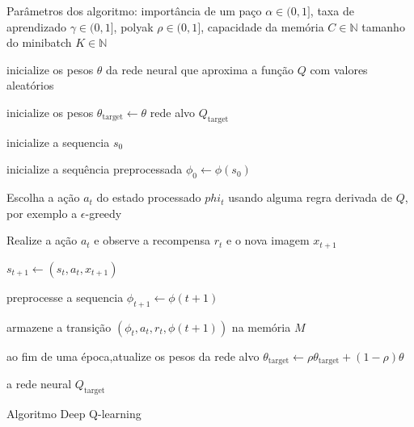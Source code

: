\begin{algorithm}[H]
    Parâmetros dos algoritmo:
    importância de um paço $\alpha \in (0,1]$,
    taxa de aprendizado $\gamma \in (0,1]$,
    polyak $\rho \in (0,1]$,
    capacidade da memória $C \in \mathbb{N}$
    tamanho do minibatch $K \in \mathbb{N}$


    inicialize os pesos $\theta$ da rede neural que aproxima a função $Q$ com valores aleatórios

    inicialize os pesos $\theta_{\text{target}}  \leftarrow \theta$ rede alvo $Q_{\text{target}}$

     {
        inicialize a sequencia $s_0$

        inicialize a sequência preprocessada $\phi_0 \leftarrow \phi(s_0)$ 
        

         {
            Escolha a ação $a_t$ do estado processado $phi_t$ usando alguma regra derivada de $Q$,
            por exemplo a $\epsilon$-greedy

            Realize a ação $a_t$ e observe a recompensa $r_t$ e o nova imagem $x_{t+1}$
            
            $s_{t+1}  \leftarrow (s_t, a_t, x_{t+1})$   

            preprocesse a sequencia $\phi_{t+1} \leftarrow \phi(t+1)$
            
            armazene a transição $(\phi_t,a_t,r_t,\phi(t+1))$ na memória $M$



        }

        ao fim de uma época,atualize os pesos da rede alvo
        $\theta_{\text{target}}  \leftarrow \rho \theta_{\text{target}}  + (1-\rho) \theta$
        
    }
    \Retorna a rede neural $Q_{\text{target}}$
    \caption{Algoritmo Deep Q-learning}
    \label{Deep:Q-learning:}
\end{algorithm}


